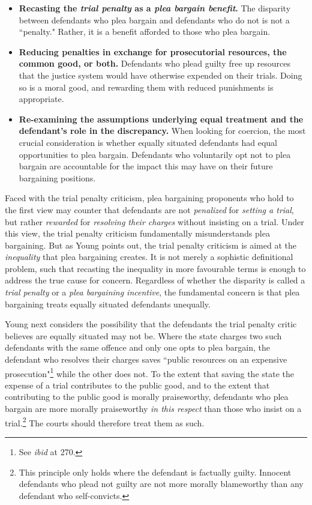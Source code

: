 \begin{itemize}
    \item \textbf{Recasting the \textit{trial penalty} as a \textit{plea bargain benefit}.} The disparity between defendants who plea bargain and defendants who do not is not a ``penalty." Rather, it is a benefit afforded to those who plea bargain.
    \item \textbf{Reducing penalties in exchange for prosecutorial resources, the common good, or both.} Defendants who plead guilty free up resources that the justice system would have otherwise expended on their trials. Doing so is a moral good, and rewarding them with reduced punishments is appropriate.
    \item \textbf{Re-examining the assumptions underlying equal treatment and the defendant's role in the discrepancy.} When looking for coercion, the most crucial consideration is whether equally situated defendants had equal opportunities to plea bargain. Defendants who voluntarily opt not to plea bargain are accountable for the impact this may have on their future bargaining positions.
\end{itemize}
Faced with the trial penalty criticism, plea bargaining proponents who hold to the first view may counter that defendants are not \textit{penalized} for \textit{setting a trial}, but rather \textit{rewarded} for \textit{resolving their charges} without insisting on a trial. Under this view, the trial penalty criticism fundamentally misunderstands plea bargaining. But as Young points out, the trial penalty criticism is aimed at the \textit{inequality} that plea bargaining creates. It is not merely a sophistic definitional problem, such that recasting the inequality in more favourable terms is enough to address the true cause for concern. Regardless of whether the disparity is called a \textit{trial penalty} or a \textit{plea bargaining incentive}, the fundamental concern is that plea bargaining treats equally situated defendants unequally.

Young next considers the possibility that the defendants the trial penalty critic believes are equally situated may not be. Where the state charges two such defendants with the same offence and only one opts to plea bargain, the defendant who resolves their charges saves ``public resources on an expensive prosecution"\footnote{See \textit{ibid} at 270.} while the other does not. To the extent that saving the state the expense of a trial contributes to the public good, and to the extent that contributing to the public good is morally praiseworthy, defendants who plea bargain are more morally praiseworthy \textit{in this respect} than those who insist on a trial.\footnote{This principle only holds where the defendant is factually guilty. Innocent defendants who plead not guilty are not more morally blameworthy than any defendant who self-convicts.} The courts should therefore treat them as such.


